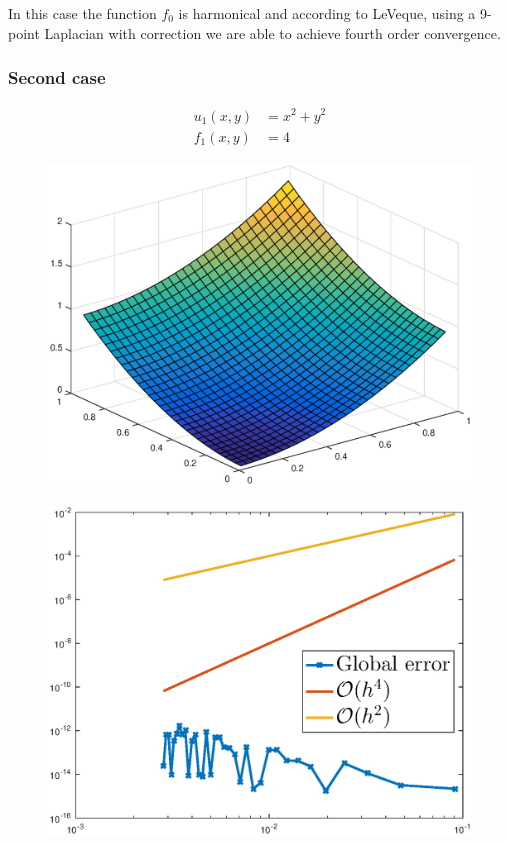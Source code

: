 \documentclass[main.tex]{subfiles}
\begin{document}
In this case the function $f_0$ is harmonical and according to LeVeque, using a 9-point Laplacian with correction we are able to achieve fourth order convergence.

\subsubsection*{Second case}
\begin{align}
    u_{1}(x,y) &= x^2 + y^2 \\
    f_1(x,y) &= 4
\end{align}

\begin{figure}[h]
\centering
\begin{minipage}{.45\textwidth}
  \centering
  \includegraphics[width=.9\linewidth]{../Figures/ex2u1calc}
  \label{fig:ex2:u1calc}
\end{minipage}\hfill%
\begin{minipage}{.45\textwidth}
  \centering
  \includegraphics[width=.9\linewidth]{../Figures/ex2u1err}
  \label{fig:ex2:u1err}
\end{minipage}
\end{figure}
\end{document}

